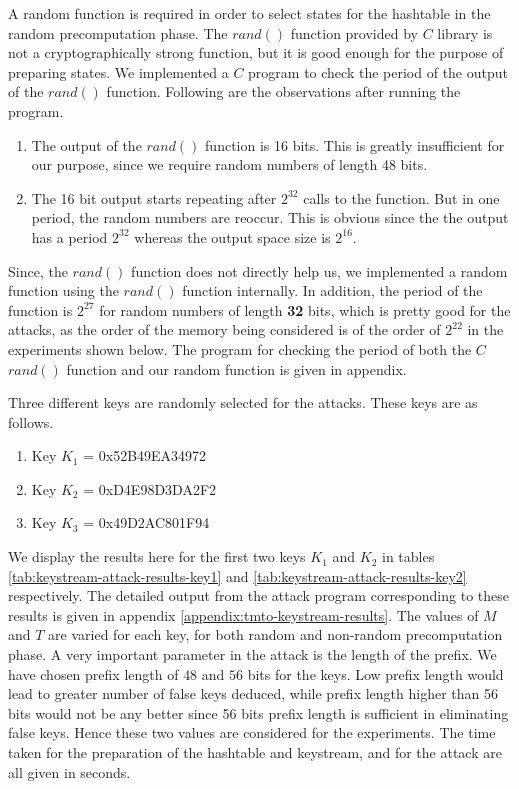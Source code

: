 
A random function is required in order to select states for the hashtable in the random precomputation phase. The $rand()$ function provided by $C$ library is not a cryptographically strong function, but it is good enough for the purpose of preparing states. We implemented a $C$ program to check the period of the output of the $rand()$ function. Following are the observations after running the program.

\begin{enumerate}
\item The output of the $rand()$ function is 16 bits. This is greatly insufficient for our purpose, since we require random numbers of length 48 bits. 
\item The 16 bit output starts repeating after $2^{32}$ calls to the function. But in one period, the random numbers are reoccur. This is obvious since the the output has a period $2^{32}$ whereas the output space size is $2^{16}$. 
\end{enumerate}

Since, the $rand()$ function does not directly help us, we implemented a random function using the $rand()$ function internally. In addition, the period of the function is $2^{27}$ for random numbers of length \textbf{32} bits, which is pretty good for the attacks, as the order of the memory being considered is of the order of $2^{22}$ in the experiments shown below. The program for checking the period of both the $C$ $rand()$ function and our random function is given in appendix.

Three different keys are randomly selected for the attacks. These keys are as follows.

\begin{enumerate}
\item Key $K_1$ = 0x52B49EA34972
\item Key $K_2$ = 0xD4E98D3DA2F2
\item Key $K_3$ = 0x49D2AC801F94
\end{enumerate}

We display the results here for the first two keys $K_1$ and $K_2$ in tables \ref{tab:keystream-attack-results-key1} and \ref{tab:keystream-attack-results-key2} respectively. The detailed output from the attack program corresponding to these results is given in appendix \ref{appendix:tmto-keystream-results}. The values of $M$ and $T$ are varied for each key, for both random and non-random precomputation phase. A very important parameter in the attack is the length of the prefix. We have chosen prefix length of $48$ and $56$ bits for the keys. Low prefix length would lead to greater number of false keys deduced, while prefix length higher than 56 bits would not be any better since 56 bits prefix length is sufficient in eliminating false keys. Hence these two values are considered for the experiments. The time taken for the preparation of the hashtable and keystream, and for the attack are all given in seconds. 


